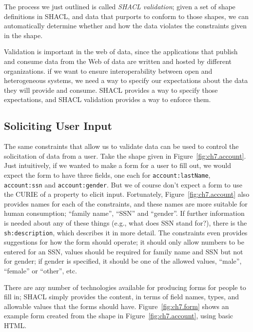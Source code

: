 The process we just outlined is called \emph{SHACL validation}; given a set of
shape definitions in SHACL, and data that purports to conform to those shapes,
we can automatically determine whether and how the data violates the constraints
given in the shape.

Validation is important in the web of data, since the applications
that publish and consume data from the Web of data are  written and
hosted by different organizations.  if we want to ensure
interoperability between open and heterogeneous systems, we need a way
to specify our expectations about the data they will provide and
consume.  SHACL provides a way to specify those expectations, and
SHACL validation provides a way to enforce them.



\subsection{Soliciting User Input}\label{soliciting}

The same constraints that allow us to validate data can be used to
control the solicitation of data from a user.  Take the shape given in
Figure~\ref{fig:ch7.account}.  Just intuitively, if we wanted to make
a form for a user to fill out, we would expect the form to have three
fields, one each for \texttt{account:lastName}, \texttt{account:ssn}
and \texttt{account:gender}.  But we of course don't expect a form to
use the CURIE of a property to elicit input.  Fortunately,
Figure~\ref{fig:ch7.account} also provides names for each of the
constraints, and these names are more suitable for human consumption;
``family name'', ``SSN'' and ``gender''.  If further information is
needed about any of these things (e.g., what does SSN stand for?),
there is the \texttt{sh:description}, which describes it in more
detail.  The constraints even
provides suggestions for how the form should operate; it should only 
allow numbers to be entered for an SSN, values should be required for family name
and SSN but not for gender; if gender is specified, it  should be one of the allowed values, 
``male'', ``female'' or ``other'', etc. 

There are any number of technologies available for producing forms for
people to fill in; SHACL simply provides the content, in terms of
field names, types, and allowable values that the forms should have.
Figure~\ref{fig:ch7.form} shows an example form created from the shape
in Figure~\ref{fig:ch7.account}, using basic HTML.

